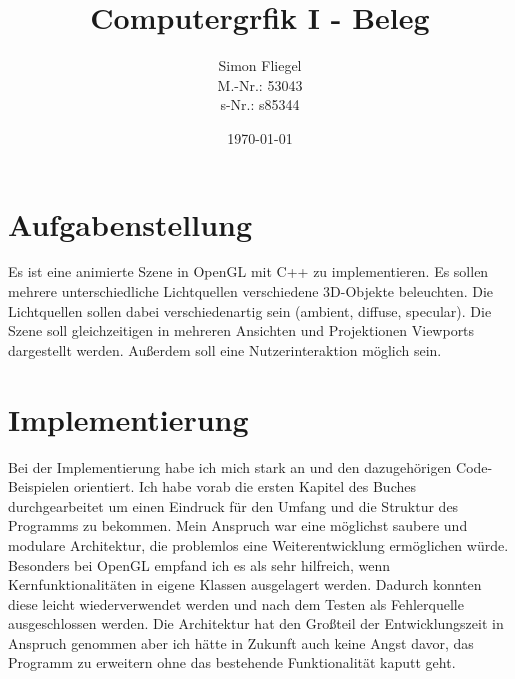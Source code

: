 \documentclass{article}
\let\oldsection\section
\renewcommand\section{\needspace{10\baselineskip}\oldsection}
\begin{document}
\title{Computergrfik I - Beleg}
\author{Simon Fliegel \\ M.-Nr.: 53043 \\ s-Nr.: s85344}
\date{\today}

\maketitle

\tableofcontents

\listoffigures

\clearpage

\section{Aufgabenstellung}
Es ist eine animierte Szene in OpenGL mit C++ zu implementieren.
Es sollen mehrere unterschiedliche Lichtquellen verschiedene 3D-Objekte beleuchten.
Die Lichtquellen sollen dabei verschiedenartig sein (ambient, diffuse, specular).
Die Szene soll gleichzeitigen in mehreren Ansichten und Projektionen Viewports dargestellt werden.
Außerdem soll eine Nutzerinteraktion möglich sein.

\section{Implementierung}
Bei der Implementierung habe ich mich stark an \cite{learnopengl} und den dazugehörigen Code-Beispielen \cite{repository} orientiert.
Ich habe vorab die ersten Kapitel des Buches durchgearbeitet um einen Eindruck für den Umfang und die Struktur des Programms zu bekommen.
Mein Anspruch war eine möglichst saubere und modulare Architektur, die problemlos eine Weiterentwicklung ermöglichen würde.
Besonders bei OpenGL empfand ich es als sehr hilfreich, wenn Kernfunktionalitäten in eigene Klassen ausgelagert werden.
Dadurch konnten diese leicht wiederverwendet werden und nach dem Testen als Fehlerquelle ausgeschlossen werden.
Die Architektur hat den Großteil der Entwicklungszeit in Anspruch genommen aber ich hätte in Zukunft auch keine Angst davor, das Programm zu erweitern ohne das bestehende Funktionalität kaputt geht.
\end{document}

